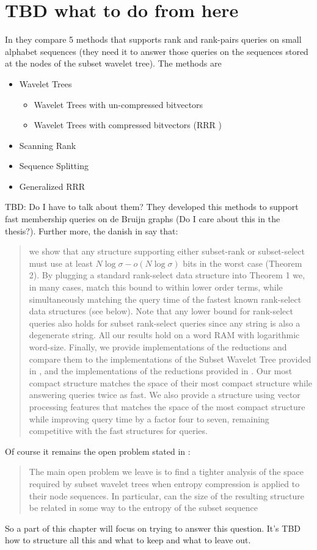 \section{TBD what to do from here}
In \cite{SubsetWT} they compare 5 methods that supports rank and rank-pairs queries on small alphabet sequences (they need it to answer those queries on the sequences stored at the nodes of the subset wavelet tree). The methods are
\begin{itemize}
    \item Wavelet Trees
        \begin{itemize}
            \item Wavelet Trees with un-compressed bitvectors
            \item Wavelet Trees with compressed bitvectors (RRR \cite{RRR2002})
        \end{itemize}
    \item Scanning Rank
    \item Sequence Splitting
    \item Generalized RRR
\end{itemize}
TBD: Do I have to talk about them? They developed this methods to support fast membership queries on de Bruijn graphs (Do I care about this in the thesis?). Further more, the danish in \cite{bille2023rank} say that:
\begin{quote}
    we show that any structure supporting either subset-rank or subset-select must use at least $N \log \sigma - o(N \log \sigma)$ bits in the worst case (Theorem 2). By plugging a standard rank-select data structure into Theorem 1 we, in many cases, match this bound to within lower order terms, while simultaneously matching the query time of the fastest known rank-select data structures (see below). Note that any lower bound for rank-select queries also holds for subset rank-select queries since any string is also a degenerate string. All our results hold on a word RAM with logarithmic word-size. Finally, we provide implementations of the reductions and compare them to the implementations of the Subset Wavelet Tree provided in \cite{SubsetWT}, and the implementations of the reductions provided in \cite{alanko2023small}. Our most compact structure matches the space of their most compact structure while answering queries twice as fast. We also provide a structure using vector processing features that matches the space of the most compact structure while improving query time by a factor four to seven, remaining competitive with the fast structures for queries.
\end{quote}
Of course it remains the open problem stated in \cite{SubsetWT}:
\begin{quote}
    The main open problem we leave is to find a tighter analysis of the space required by subset wavelet trees when entropy compression is applied to their node sequences. In particular, can the size of the resulting structure be related in some way to the entropy of the subset sequence
\end{quote}
So a part of this chapter will focus on trying to answer this question. It's TBD how to structure all this and what to keep and what to leave out.
